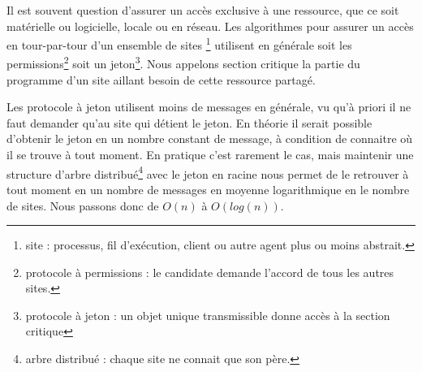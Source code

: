 Il est souvent question d'assurer un accès exclusive à une ressource, que ce soit matérielle ou logicielle, locale ou en réseau. Les algorithmes pour assurer un accès en tour-par-tour d'un ensemble de \og sites \fg{}\footnote{ site : processus, fil d'exécution, client ou autre agent plus ou moins abstrait.} utilisent en générale soit les permissions\footnote{protocole à permissions : le candidate demande l'accord de tous les autres sites.} soit un jeton\footnote{protocole à jeton : un objet unique transmissible donne accès à la section critique}. Nous appelons \og section critique \fg{} la partie du programme d'un site aillant besoin de cette ressource partagé.

Les protocole à jeton utilisent moins de messages en générale, vu qu'à priori il ne faut demander qu'au site qui détient le jeton. En théorie il serait possible d'obtenir le jeton en un nombre constant de message, à condition de connaitre où il se trouve à tout moment. En pratique c'est rarement le cas, mais maintenir une structure d'arbre distribué\footnote{arbre distribué : chaque site ne connait que son père.} avec le jeton en racine nous permet de le retrouver à tout moment en un nombre de messages en moyenne logarithmique en le nombre de sites. Nous passons donc de $O(n)$ à $O(log(n))$.